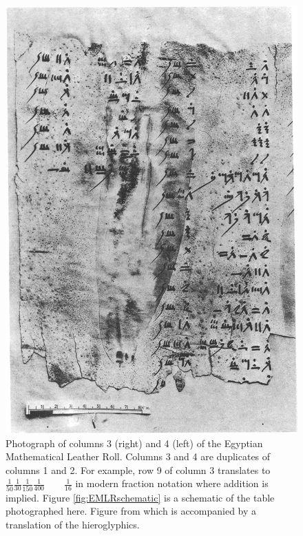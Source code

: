 \begin{figure}
  \centering
  \includegraphics[width=\textwidth]{gfx/EMLR.jpg}
  \caption[Photograph of columns 3 and 4 of the Egyptian Mathematical Leather Roll.]
  {Photograph of columns 3 (right) and 4 (left) of the Egyptian Mathematical Leather Roll. Columns 3 and 4 are duplicates of columns 1 and 2. For example, row 9 of column 3 translates to $\displaystyle \frac{1}{50}\frac{1}{30}\frac{1}{150}\frac{1}{400} \quad\quad \frac{1}{16}$ in modern fraction notation where addition is implied. Figure \ref{fig:EMLRschematic} is a schematic of the table photographed here. Figure from \citet{Glanville27} which is accompanied by a translation of the hieroglyphics.}
  \label{fig:EMLR}
\end{figure}


